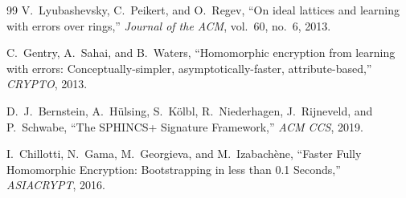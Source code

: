 \begin{thebibliography}{99}
V.~Lyubashevsky, C.~Peikert, and O.~Regev, ``On ideal lattices and
learning with errors over rings,'' \textit{Journal of the ACM},
vol.~60, no.~6, 2013.

C.~Gentry, A.~Sahai, and B.~Waters, ``Homomorphic encryption from
learning with errors: Conceptually-simpler, asymptotically-faster,
attribute-based,'' \textit{CRYPTO}, 2013.

D.~J.~Bernstein, A.~H\"{u}lsing, S.~K\"{o}lbl, R.~Niederhagen,
J.~Rijneveld, and P.~Schwabe, ``The SPHINCS+ Signature Framework,''
\textit{ACM CCS}, 2019.

I.~Chillotti, N.~Gama, M.~Georgieva, and M.~Izabach\`{e}ne, ``Faster
Fully Homomorphic Encryption: Bootstrapping in less than 0.1
Seconds,'' \textit{ASIACRYPT}, 2016.

\end{thebibliography}

